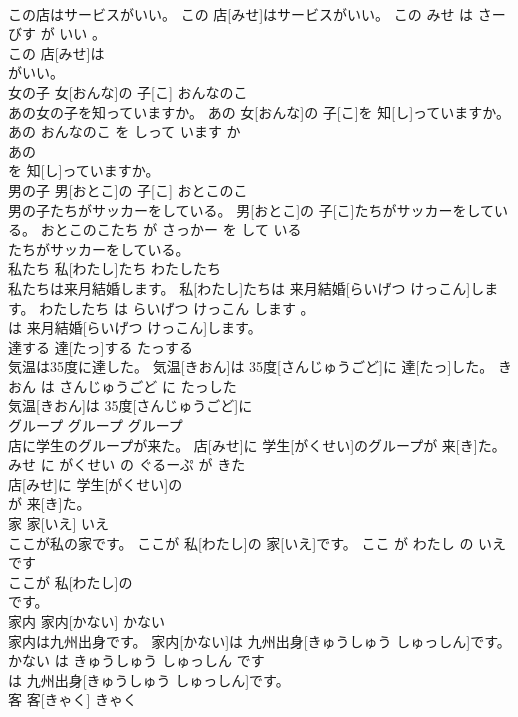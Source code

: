 \documentclass[8pt]{extreport}
\begin{document}
\begin{CJK}{UTF8}{min}
\\	この店はサービスがいい。	この 店[みせ]はサービスがいい。	この みせ は さーびす が いい 。	
\\	この 店[みせ]は
\\	がいい。			
\\	女の子	女[おんな]の 子[こ]	おんなのこ	
\\	あの女の子を知っていますか。	あの 女[おんな]の 子[こ]を 知[し]っていますか。	あの おんなのこ を しって います か	
\\	あの
\\	を 知[し]っていますか。			
\\	男の子	男[おとこ]の 子[こ]	おとこのこ	
\\	男の子たちがサッカーをしている。	男[おとこ]の 子[こ]たちがサッカーをしている。	おとこのこたち が さっかー を して いる	
\\	たちがサッカーをしている。			
\\	私たち	私[わたし]たち	わたしたち	
\\	私たちは来月結婚します。	私[わたし]たちは 来月結婚[らいげつ けっこん]します。	わたしたち は らいげつ けっこん します 。	
\\	は 来月結婚[らいげつ けっこん]します。			
\\	達する	達[たっ]する	たっする	
\\	気温は35度に達した。	気温[きおん]は 35度[さんじゅうごど]に 達[たっ]した。	きおん は さんじゅうごど に たっした	
\\	気温[きおん]は 35度[さんじゅうごど]に
\\	グループ	グループ	グループ	
\\	店に学生のグループが来た。	店[みせ]に 学生[がくせい]のグループが 来[き]た。	みせ に がくせい の ぐるーぷ が きた	
\\	店[みせ]に 学生[がくせい]の
\\	が 来[き]た。			
\\	家	家[いえ]	いえ	
\\	ここが私の家です。	ここが 私[わたし]の 家[いえ]です。	ここ が わたし の いえ です	
\\	ここが 私[わたし]の
\\	です。			
\\	家内	家内[かない]	かない	
\\	家内は九州出身です。	家内[かない]は 九州出身[きゅうしゅう しゅっしん]です。	かない は きゅうしゅう しゅっしん です	
\\	は 九州出身[きゅうしゅう しゅっしん]です。			
\\	客	客[きゃく]	きゃく	

\end{CJK}
\end{document}
